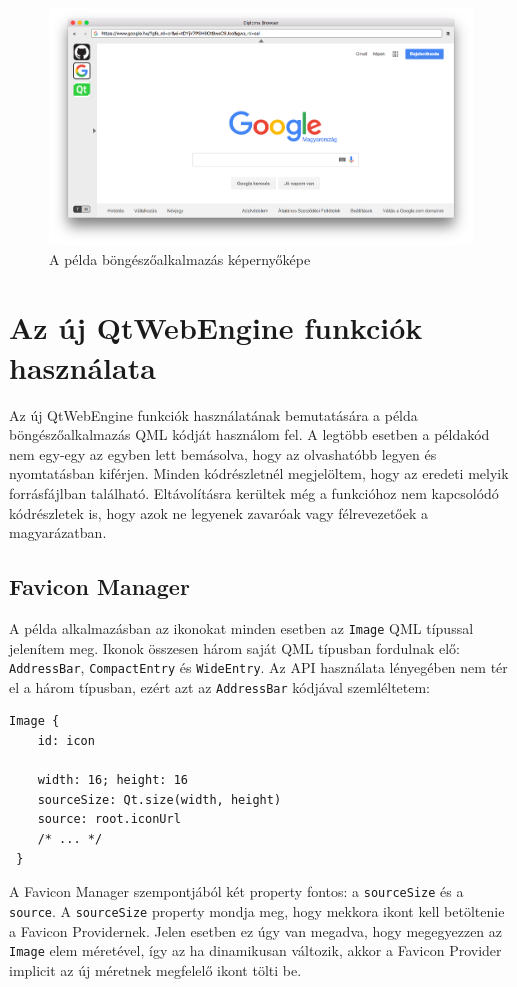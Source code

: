 \documentclass[12pt]{report}
\begin{document}
\begin{figure}[H]
    \centering
    \includegraphics[scale=0.34]{diplomabrowser}
    \caption{
        \label{fig:diplomabrowser}
        A példa böngészőalkalmazás képernyőképe
    }
\end{figure}

\newpage
\section{Az új QtWebEngine funkciók használata}

Az új QtWebEngine funkciók használatának bemutatására a példa böngészőalkalmazás QML kódját
használom fel. A legtöbb esetben a példakód nem egy-egy az egyben lett bemásolva, hogy az
olvashatóbb legyen és nyomtatásban kiférjen. Minden kódrészletnél megjelöltem, hogy az eredeti
melyik forrásfájlban található. Eltávolításra kerültek még a funkcióhoz nem kapcsolódó
kódrészletek is, hogy azok ne legyenek zavaróak vagy félrevezetőek a magyarázatban.

\subsection{Favicon Manager}

A példa alkalmazásban az ikonokat minden esetben az \texttt{Image} QML típussal jelenítem meg.
Ikonok összesen három saját QML típusban fordulnak elő: \texttt{AddressBar},
\texttt{CompactEntry} és \texttt{WideEntry}. Az API használata lényegében nem tér el a három
típusban, ezért azt az \texttt{AddressBar} kódjával szemléltetem:
\begin{lstlisting}[title=AddressBar.qml]
 Image {
    id: icon

    width: 16; height: 16
    sourceSize: Qt.size(width, height)
    source: root.iconUrl
    /* ... */
 }
\end{lstlisting}
A Favicon Manager szempontjából két property fontos: a \texttt{sourceSize} és a
\texttt{source}. A \texttt{sourceSize} property mondja meg, hogy mekkora ikont kell
betöltenie a Favicon Providernek. Jelen esetben ez úgy van megadva, hogy megegyezzen az
\texttt{Image} elem méretével, így az ha dinamikusan változik, akkor a Favicon Provider
implicit az új méretnek megfelelő ikont tölti be.
\end{document}
